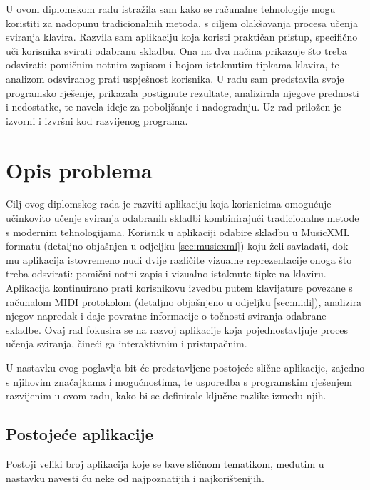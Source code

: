 \documentclass[diplomskirad, upload]{fer}
\begin{document}
U ovom diplomskom radu istražila sam kako se računalne tehnologije mogu koristiti za nadopunu tradicionalnih metoda, s ciljem olakšavanja procesa učenja sviranja klavira. Razvila sam aplikaciju koja koristi praktičan pristup, specifično uči korisnika svirati odabranu skladbu. Ona na dva načina prikazuje što treba odsvirati: pomičnim notnim zapisom i bojom istaknutim tipkama klavira, te analizom odsviranog prati uspješnost korisnika. U radu sam predstavila svoje programsko rješenje, prikazala postignute rezultate, analizirala njegove prednosti i nedostatke, te navela ideje za poboljšanje i nadogradnju. Uz rad priložen je izvorni i izvršni kod razvijenog programa.



\chapter{Opis problema}
Cilj ovog diplomskog rada je razviti aplikaciju koja korisnicima omogućuje učinkovito učenje sviranja odabranih skladbi kombinirajući tradicionalne metode s modernim tehnologijama. Korisnik u aplikaciji odabire skladbu u MusicXML formatu (detaljno objašnjen u odjeljku \ref{sec:musicxml}) koju želi savladati, dok mu aplikacija istovremeno nudi dvije različite vizualne reprezentacije onoga što treba odsvirati: pomični notni zapis i vizualno istaknute tipke na klaviru. Aplikacija kontinuirano prati korisnikovu izvedbu putem klavijature povezane s računalom MIDI protokolom (detaljno objašnjeno u odjeljku \ref{sec:midi}), analizira njegov napredak i daje povratne informacije o točnosti sviranja odabrane skladbe. Ovaj rad fokusira se na razvoj aplikacije koja pojednostavljuje proces učenja sviranja, čineći ga interaktivnim i pristupačnim.

U nastavku ovog poglavlja bit će predstavljene postojeće slične aplikacije, zajedno s njihovim značajkama i mogućnostima, te usporedba s programskim rješenjem razvijenim u ovom radu, kako bi se definirale ključne razlike između njih.

\section{Postojeće aplikacije}
Postoji veliki broj aplikacija koje se bave sličnom tematikom, međutim u nastavku navesti ću neke od najpoznatijih i najkorištenijih.
\end{document}
